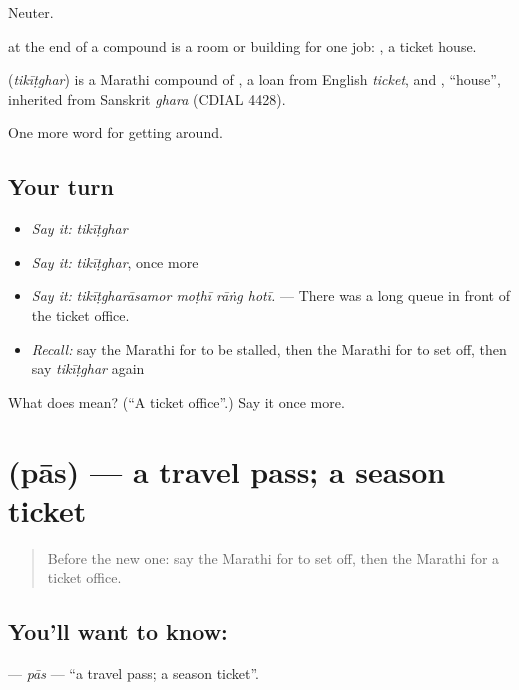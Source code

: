 Neuter.

 at the end of a compound is a room or building for one job: , a ticket house.

\begin{cousinweb}
\textbf{} (\emph{tikīṭghar}) is a Marathi compound of \textbf{}, a loan from English \emph{ticket}, and \textbf{}, \textquotedblleft{}house\textquotedblright{}, inherited from Sanskrit \emph{ghara} (CDIAL 4428).
\end{cousinweb}

\begin{grammarlens}[title={What you've built}]
One more word for getting around.
\end{grammarlens}

\subsection*{Your turn}
\begin{itemize}
\raggedright
  \item \emph{Say it:} \emph{tikīṭghar}
  \item \emph{Say it:} \emph{tikīṭghar}, once more
  \item \emph{Say it:} \emph{tikīṭgharāsamor moṭhī rāṅg hotī.} — There was a long queue in front of the ticket office.
  \item \emph{Recall:} say the Marathi for to be stalled, then the Marathi for to set off, then say \emph{tikīṭghar} again
\end{itemize}

\begin{tcolorbox}[breakable,colback=teal!4,colframe=teal!35!black,title={Before you move on}]
What does  mean? (\textquotedblleft{}A ticket office\textquotedblright{}.) Say it once more.
\end{tcolorbox}
\section[\texorpdfstring{\mr{पास} (pās)}{पास (pās)}]{ (pās) — a travel pass; a season ticket}

\label{lesson:MR-C398-pas}



\begin{quote}
Before the new one: say the Marathi for to set off, then the Marathi for a ticket office.
\end{quote}

\subsection*{You'll want to know: }
\textbf{} — \emph{pās} — \textquotedblleft{}a travel pass; a season ticket\textquotedblright{}.

